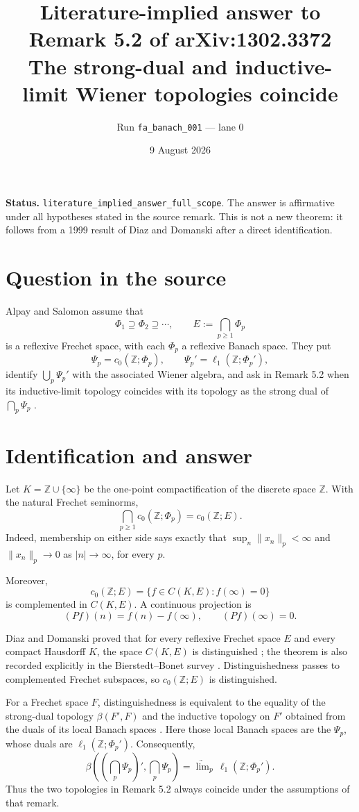\documentclass[11pt]{article}
\title{Literature-implied answer to Remark 5.2 of arXiv:1302.3372\\
\large The strong-dual and inductive-limit Wiener topologies coincide}
\author{Run \texttt{fa\_banach\_001} --- lane 0}
\date{9 August 2026}
\begin{document}
\maketitle

\textbf{Status.} \textcolor{statusblue}{\texttt{literature\_implied\_answer\_full\_scope}.}
The answer is affirmative under all hypotheses stated in the source remark.
This is not a new theorem: it follows from a 1999 result of Diaz and
Domanski after a direct identification.

\section*{Question in the source}
Alpay and Salomon assume that
\[
  \Phi_1\supseteq\Phi_2\supseteq\cdots,
  \qquad E:=\bigcap_{p\geq1}\Phi_p
\]
is a reflexive Frechet space, with each \(\Phi_p\) a reflexive Banach space.
They put
\[
 \Psi_p=c_0(\mathbb Z;\Phi_p),\qquad
 \Psi_p'=\ell_1(\mathbb Z;\Phi_p'),
\]
identify \(\bigcup_p\Psi_p'\) with the associated Wiener algebra, and ask in
Remark 5.2 when its inductive-limit topology coincides with its topology as
the strong dual of \(\bigcap_p\Psi_p\) \cite[Remark 5.2]{AS}.

\section*{Identification and answer}
Let \(K=\mathbb Z\cup\{\infty\}\) be the one-point compactification of the
discrete space \(\mathbb Z\). With the natural Frechet seminorms,
\[
 \bigcap_{p\geq1}c_0(\mathbb Z;\Phi_p)
 =c_0(\mathbb Z;E).
\]
Indeed, membership on either side says exactly that
\(\sup_n\lVert x_n\rVert_p<\infty\) and
\(\lVert x_n\rVert_p\to0\) as \(|n|\to\infty\), for every \(p\).

Moreover,
\[
 c_0(\mathbb Z;E)
 =\{f\in C(K,E):f(\infty)=0\}
\]
is complemented in \(C(K,E)\).  A continuous projection is
\[
 (Pf)(n)=f(n)-f(\infty),\qquad (Pf)(\infty)=0.
\]

Diaz and Domanski proved that for every reflexive Frechet space \(E\) and
every compact Hausdorff \(K\), the space \(C(K,E)\) is distinguished
\cite{DD}; the theorem is also recorded explicitly in the
Bierstedt--Bonet survey \cite[p.~183]{BB}. Distinguishedness passes to
complemented Frechet subspaces, so \(c_0(\mathbb Z;E)\) is distinguished.

For a Frechet space \(F\), distinguishedness is equivalent to the equality
of the strong-dual topology \(\beta(F',F)\) and the inductive topology on
\(F'\) obtained from the duals of its local Banach spaces
\cite[Sec.~3(a)]{BB}.  Here those local Banach spaces are the \(\Psi_p\),
whose duals are \(\ell_1(\mathbb Z;\Phi_p')\). Consequently,
\[
 \boxed{
 \beta\!\left(\left(\bigcap_p\Psi_p\right)',\bigcap_p\Psi_p\right)
 =\underrightarrow{\lim}_{p}\,\ell_1(\mathbb Z;\Phi_p') .}
\]
Thus the two topologies in Remark 5.2 always coincide under the assumptions
of that remark.
\end{document}
